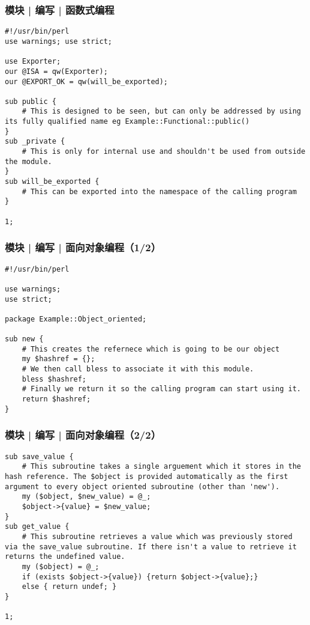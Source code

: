 \begin{frame}[fragile]
  \frametitle{模块 | 编写 | 函数式编程}
\begin{lstlisting}[basicstyle=\scriptsize\tt,numberstyle=\scriptsize]
#!/usr/bin/perl
use warnings; use strict;

use Exporter;
our @ISA = qw(Exporter);
our @EXPORT_OK = qw(will_be_exported);

sub public {
    # This is designed to be seen, but can only be addressed by using its fully qualified name eg Example::Functional::public()
}
sub _private {
    # This is only for internal use and shouldn't be used from outside the module.
}
sub will_be_exported {
    # This can be exported into the namespace of the calling program
}

1;
\end{lstlisting}
\end{frame}

\begin{frame}[fragile]
  \frametitle{模块 | 编写 | 面向对象编程（1/2）}
\begin{lstlisting}[basicstyle=\footnotesize\tt,numberstyle=\scriptsize]
#!/usr/bin/perl

use warnings;
use strict;

package Example::Object_oriented;

sub new {
    # This creates the refernece which is going to be our object
    my $hashref = {};
    # We then call bless to associate it with this module.
    bless $hashref;
    # Finally we return it so the calling program can start using it.
    return $hashref;
}
\end{lstlisting}
\end{frame}

\begin{frame}[fragile]
  \frametitle{模块 | 编写 | 面向对象编程（2/2）}
\begin{lstlisting}[firstnumber=16,basicstyle=\footnotesize\tt,numberstyle=\scriptsize]
sub save_value {
    # This subroutine takes a single arguement which it stores in the hash reference. The $object is provided automatically as the first argument to every object oriented subroutine (other than 'new').
    my ($object, $new_value) = @_;
    $object->{value} = $new_value;
}
sub get_value {
    # This subroutine retrieves a value which was previously stored via the save_value subroutine. If there isn't a value to retrieve it returns the undefined value.
    my ($object) = @_;
    if (exists $object->{value}) {return $object->{value};}
    else { return undef; }
}

1;
\end{lstlisting}
\end{frame}

